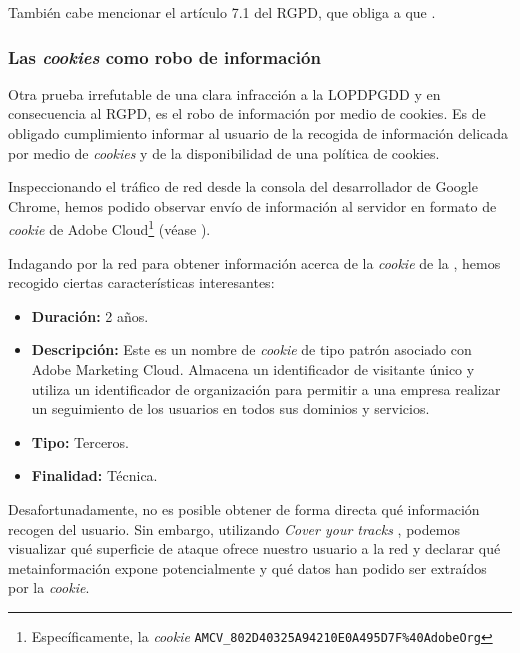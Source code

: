 \documentclass[es]{uc3mreport}
\begin{document}
\begin{report}

        También cabe mencionar el artículo 7.1 del RGPD, que obliga a que .



        \subsubsection{Las \textit{cookies} como robo de información}
        Otra prueba irrefutable de una clara infracción a la LOPDPGDD y en consecuencia al RGPD, es el robo de información por medio de cookies. Es de obligado cumplimiento informar al usuario de la recogida de información delicada por medio de \textit{cookies} y de la disponibilidad de una política de cookies.

        Inspeccionando el tráfico de red desde la consola del desarrollador de Google Chrome, hemos podido observar envío de información al servidor en formato de \textit{cookie} de Adobe Cloud\footnote{Específicamente, la \textit{cookie} \texttt{AMCV\_802D40325A94210E0A495D7F\%40AdobeOrg}} (véase ).


        Indagando por la red para obtener información acerca de la \textit{cookie} de la , hemos recogido ciertas características interesantes:
        \begin{itemize}
            \item \textbf{Duración:} 2 años.
            \item \textbf{Descripción:} Este es un nombre de \textit{cookie} de tipo patrón asociado con Adobe Marketing Cloud. Almacena un identificador de visitante único y utiliza un identificador de organización para permitir a una empresa realizar un seguimiento de los usuarios en todos sus dominios y servicios.
            \item \textbf{Tipo:} Terceros.
            \item \textbf{Finalidad:} Técnica.
        \end{itemize}

        Desafortunadamente, no es posible obtener de forma directa qué información recogen del usuario. Sin embargo, utilizando \textit{Cover your tracks} \cite{coveryourtracks}, podemos visualizar qué superficie de ataque ofrece nuestro usuario a la red y declarar qué metainformación expone potencialmente y qué datos han podido ser extraídos por la \textit{cookie}.


\end{report}
\end{document}
